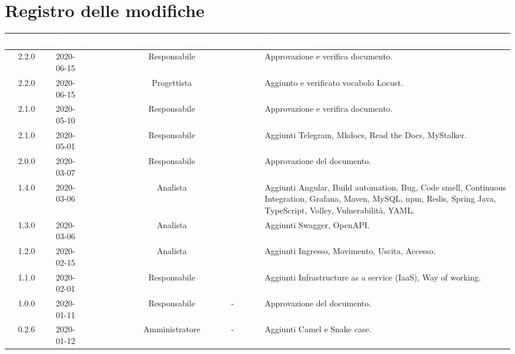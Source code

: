 \section*{Registro delle modifiche}
{
\renewcommand{\arraystretch}{1.5}
\centering
\begin{longtable}{ c c  C{2.5cm} c c C{3.5cm}}
\textcolor{white}{\textbf{Versione}}&
\textcolor{white}{\textbf{Data}}&
\textcolor{white}{\textbf{Nominativo}}&
\textcolor{white}{\textbf{Ruolo}}&
\textcolor{white}{\textbf{Verificatore}}&
\textcolor{white}{\textbf{Descrizione}}\\	
\endhead

2.2.0 & 2020-06-15 & \CE{} & Responsabile & \PF{} & Approvazione e verifica documento. \\

2.2.0 & 2020-06-15 & \AT{} & Progettista & \PF{} & Aggiunto e verificato vocabolo Locust. \\

2.1.0 & 2020-05-10 & \BR{} & Responsabile & \DF{} & Approvazione e verifica documento. \\

2.1.0 & 2020-05-01 & \AT{} & Responsabile & \AT{} & Aggiunti Telegram, Mkdocs, Read the Docs, MyStalker. \\

2.0.0 & 2020-03-07 & \BR{} & Responsabile & \AT{} & Approvazione del documento. \\

1.4.0 & 2020-03-06 & \MC{} & Analista & \AT{} & Aggiunti Angular, Build automation, Bug, Code smell, Continuous Integration, Grafana, Maven, MySQL, npm, Redis, Spring Java, TypeScript, Volley, Vulnerabilità, YAML. \\

1.3.0 & 2020-03-06 & \MC{} & Analista & \AT{} & Aggiunti Swagger, OpenAPI. \\

1.2.0 & 2020-02-15 & \AT{} & Analista & \PF{} & Aggiunti Ingresso, Movimento, Uscita, Accesso. \\

1.1.0 & 2020-02-01 & \MC{} & Responsabile & \AT{} & Aggiunti Infrastructure as a service (IaaS), Way of working. \\

1.0.0 & 2020-01-11 & \SE{} & Responsabile & - & Approvazione del documento. \\

0.2.6 & 2020-01-12 & \AT{} & Amministratore & - & Aggiunti Camel e Snake case. \\


\end{longtable}}
